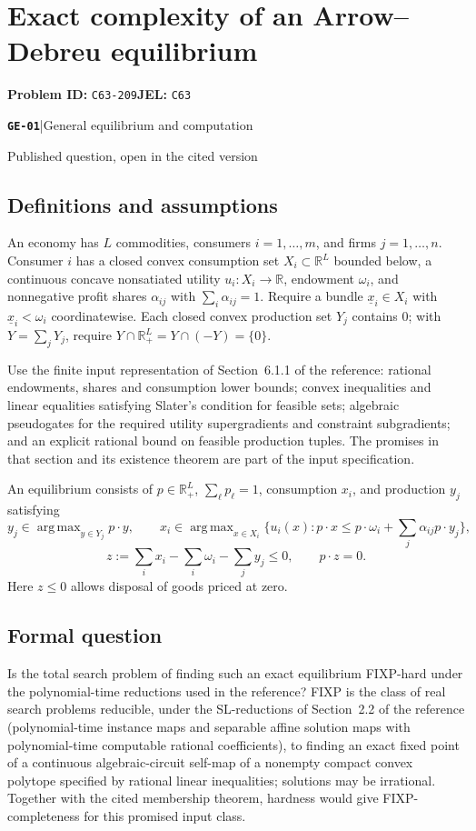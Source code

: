 \documentclass[11pt,a4paper]{article}
\newcommand{\R}{\mathbb R}
\DeclareMathOperator*{\argmax}{arg\,max}
\newcommand{\entrymeta}[3]{{\sffamily\small\color{muted}\textbf{\texttt{#1}}\quad|\quad #2\par #3\par}}
\begin{document}
\section*{Exact complexity of an Arrow--Debreu equilibrium}
\textbf{Problem ID:} \texttt{C63-209}\quad \textbf{JEL:} \texttt{C63}\par
\label{problem:OP-0573}
\label{beyond:GE-01}
\entrymeta{GE-01}{General equilibrium and computation}{Published question, open in the cited version}
\subsection*{Definitions and assumptions}
An economy has $L$ commodities, consumers $i=1,\ldots,m$, and firms $j=1,\ldots,n$. Consumer $i$ has a closed convex consumption set $X_i\subset\R^L$ bounded below, a continuous concave nonsatiated utility $u_i:X_i\to\R$, endowment $\omega_i$, and nonnegative profit shares $\alpha_{ij}$ with $\sum_i\alpha_{ij}=1$. Require a bundle $\underline x_i\in X_i$ with $\underline x_i<\omega_i$ coordinatewise. Each closed convex production set $Y_j$ contains $0$; with $Y=\sum_jY_j$, require $Y\cap\R^L_+=Y\cap(-Y)=\{0\}$.

Use the finite input representation of Section~6.1.1 of the reference: rational endowments, shares and consumption lower bounds; convex inequalities and linear equalities satisfying Slater's condition for feasible sets; algebraic pseudogates for the required utility supergradients and constraint subgradients; and an explicit rational bound on feasible production tuples. The promises in that section and its existence theorem are part of the input specification.

An equilibrium consists of $p\in\R^L_+$, $\sum_\ell p_\ell=1$, consumption $x_i$, and production $y_j$ satisfying
\[
 y_j\in\argmax_{y\in Y_j}p\cdot y,\qquad
 x_i\in\argmax_{x\in X_i}\{u_i(x):p\cdot x\le p\cdot\omega_i+\textstyle\sum_j\alpha_{ij}p\cdot y_j\},
\]
\[
 z:=\sum_ix_i-\sum_i\omega_i-\sum_jy_j\le0,\qquad p\cdot z=0.
\]
Here $z\le0$ allows disposal of goods priced at zero.
\subsection*{Formal question}
Is the total search problem of finding such an exact equilibrium FIXP-hard under the polynomial-time reductions used in the reference? FIXP is the class of real search problems reducible, under the SL-reductions of Section~2.2 of the reference (polynomial-time instance maps and separable affine solution maps with polynomial-time computable rational coefficients), to finding an exact fixed point of a continuous algebraic-circuit self-map of a nonempty compact convex polytope specified by rational linear inequalities; solutions may be irrational. Together with the cited membership theorem, hardness would give FIXP-completeness for this promised input class.
\end{document}
